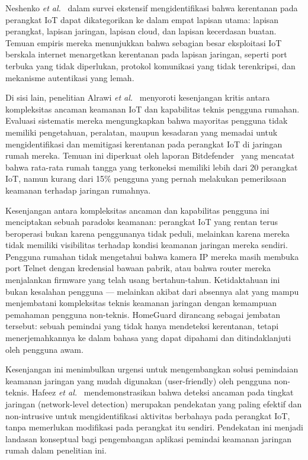 Neshenko \textit{et al.}~\cite{b8} dalam survei ekstensif mengidentifikasi
bahwa kerentanan pada perangkat IoT dapat dikategorikan ke dalam empat lapisan
utama: lapisan perangkat, lapisan jaringan, lapisan cloud, dan lapisan
kecerdasan buatan. Temuan empiris mereka menunjukkan bahwa sebagian besar
eksploitasi IoT berskala internet menargetkan kerentanan pada lapisan jaringan,
seperti port terbuka yang tidak diperlukan, protokol komunikasi yang tidak
terenkripsi, dan mekanisme autentikasi yang lemah.

Di sisi lain, penelitian Alrawi \textit{et al.}~\cite{b2} menyoroti kesenjangan
kritis antara kompleksitas ancaman keamanan IoT dan kapabilitas teknis pengguna
rumahan. Evaluasi sistematis mereka mengungkapkan bahwa mayoritas pengguna
tidak memiliki pengetahuan, peralatan, maupun kesadaran yang memadai untuk
mengidentifikasi dan memitigasi kerentanan pada perangkat IoT di jaringan rumah
mereka. Temuan ini diperkuat oleh laporan Bitdefender~\cite{b3} yang mencatat
bahwa rata-rata rumah tangga yang terkoneksi memiliki lebih dari 20 perangkat
IoT, namun kurang dari 15\% pengguna yang pernah melakukan pemeriksaan keamanan
terhadap jaringan rumahnya.

Kesenjangan antara kompleksitas ancaman dan kapabilitas pengguna ini
menciptakan sebuah paradoks keamanan: perangkat IoT yang rentan terus
beroperasi bukan karena penggunanya tidak peduli, melainkan karena mereka tidak
memiliki visibilitas terhadap kondisi keamanan jaringan mereka sendiri.
Pengguna rumahan tidak mengetahui bahwa kamera IP mereka masih membuka port
Telnet dengan kredensial bawaan pabrik, atau bahwa router mereka menjalankan
firmware yang telah usang bertahun-tahun. Ketidaktahuan ini bukan kesalahan
pengguna --- melainkan akibat dari absennya alat yang mampu menjembatani
kompleksitas teknis keamanan jaringan dengan kemampuan pemahaman pengguna
non-teknis. HomeGuard dirancang sebagai jembatan tersebut: sebuah pemindai yang
tidak hanya mendeteksi kerentanan, tetapi menerjemahkannya ke dalam bahasa yang
dapat dipahami dan ditindaklanjuti oleh pengguna awam.

Kesenjangan ini menimbulkan urgensi untuk mengembangkan solusi pemindaian
keamanan jaringan yang mudah digunakan (user-friendly) oleh pengguna
non-teknis. Hafeez \textit{et al.}~\cite{b4} mendemonstrasikan bahwa deteksi
ancaman pada tingkat jaringan (network-level detection) merupakan pendekatan
yang paling efektif dan non-intrusive untuk mengidentifikasi aktivitas
berbahaya pada perangkat IoT, tanpa memerlukan modifikasi pada perangkat itu
sendiri. Pendekatan ini menjadi landasan konseptual bagi pengembangan aplikasi
pemindai keamanan jaringan rumah dalam penelitian ini.


